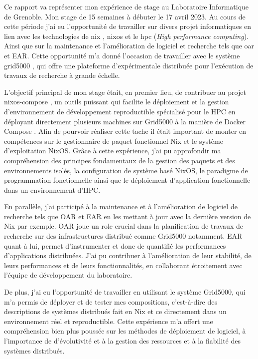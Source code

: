 \documentclass[a4paper,french,12pt, titlepage]{article}
\begin{document}
Ce rapport va représenter mon expérience de stage au Laboratoire
Informatique de Grenoble. Mon stage de 15 semaines à débuter le 17 avril
2023. Au cours de cette période j'ai eu l'opportunité de travailler sur
divers projet informatiques en lien avec les technologies de \Gls{nix}
\cite{nix2004}, \Gls{nixos} \cite{nixos2010} et le \Gls{hpc} (\emph{High
performance computing}). Ainsi que sur la maintenance et l'amélioration
de logiciel et recherche tels que \Gls{oar} \cite{oar2005} et EAR. Cette
opportunité m'a donné l'occasion de travailler avec le système
\Gls{grid5000} \cite{grid5000-2005}, qui offre une plateforme
d'expérimentale distribuée pour l'exécution de travaux de recherche à
grande échelle.\newline

L'objectif principal de mon stage était, en premier lieu, de contribuer
au projet \Gls{nixos-compose} \cite{nixoscompose2022}, un outils
puissant qui facilite le déploiement et la gestion d'environnement de
développement reproductible spécialisé pour le HPC en déployant
directement plusieurs machines sur Grid5000 à la manière de Docker
Compose \cite{docker2017}. Afin de pourvoir réaliser cette tache il
était important de monter en compétences sur le gestionnaire de paquet
fonctionnel Nix et le système d'exploitation NixOS. Grâce à cette
expérience, j'ai pu approfondir ma compréhension des principes
fondamentaux de la gestion des paquets et des environnements isolés, la
configuration de système basé NixOS, le paradigme de programmation
fonctionnelle ainsi que le déploiement d'application fonctionnelle dans
un environnement d'HPC.\newline

En parallèle, j'ai participé à la maintenance et à l'amélioration de
logiciel de recherche tels que OAR et EAR en les mettant à jour avec la
dernière version de Nix par exemple. OAR joue un role crucial dans la
planification de travaux de recherche sur des infrastructures distribué
comme Grid5000 notamment. EAR quant à lui, permet d'instrumenter et donc
de quantifié les performances d'applications distribuées. J'ai pu
contribuer à l'amélioration de leur stabilité, de leurs performances et
de leurs fonctionnalités, en collaborant étroitement avec l'équipe de
développement du laboratoire.\newline

De plus, j'ai eu l'opportunité de travailler en utilisant le système
Grid5000, qui m'a permis de déployer et de tester mes
\glspl{composition}, c'est-à-dire des descriptions de systèmes
distribués fait en Nix et ce directement dans un environnement réel et
reproductible. Cette expérience m'a offert une compréhension bien plus
poussée sur les méthodes de déploiement de logiciel, à l'importance de
d'évolutivité et à la gestion des ressources et à la fiabilité des
systèmes distribués.\newline
\end{document}
